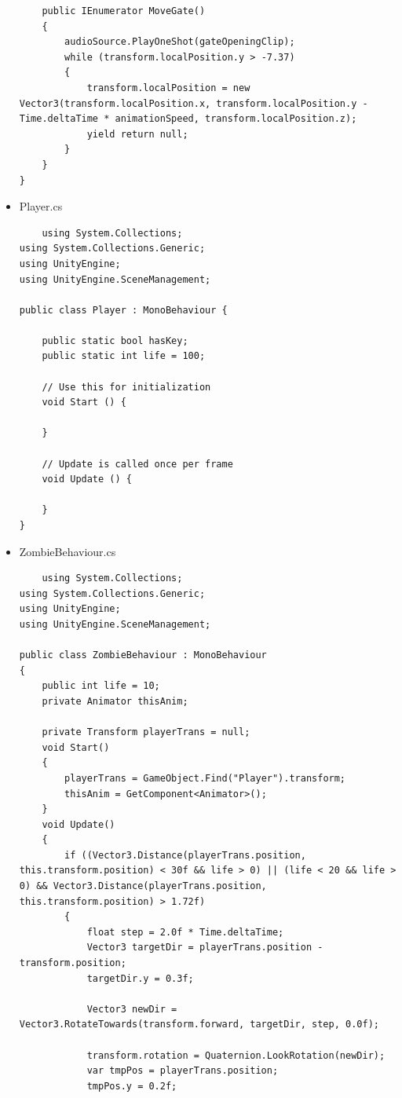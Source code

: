 \documentclass[12pt,a4paper]{article}
\begin{document}
\begin{itemize}
\begin{verbatim}
    public IEnumerator MoveGate()
    {
        audioSource.PlayOneShot(gateOpeningClip);
        while (transform.localPosition.y > -7.37)
        {
            transform.localPosition = new Vector3(transform.localPosition.x, transform.localPosition.y - Time.deltaTime * animationSpeed, transform.localPosition.z);
            yield return null;
        }
    }
}

	\end{verbatim}
	\item Player.cs
	\begin{verbatim}
	using System.Collections;
using System.Collections.Generic;
using UnityEngine;
using UnityEngine.SceneManagement;

public class Player : MonoBehaviour {

    public static bool hasKey;
    public static int life = 100;

	// Use this for initialization
	void Start () {
		
	}
	
	// Update is called once per frame
	void Update () {
        
    }
}

	\end{verbatim}
	\item ZombieBehaviour.cs
	\begin{verbatim}
	using System.Collections;
using System.Collections.Generic;
using UnityEngine;
using UnityEngine.SceneManagement;

public class ZombieBehaviour : MonoBehaviour
{
    public int life = 10;
    private Animator thisAnim;

    private Transform playerTrans = null;
    void Start()
    {
        playerTrans = GameObject.Find("Player").transform;
        thisAnim = GetComponent<Animator>();
    }
    void Update()
    {
        if ((Vector3.Distance(playerTrans.position, this.transform.position) < 30f && life > 0) || (life < 20 && life > 0) && Vector3.Distance(playerTrans.position, this.transform.position) > 1.72f)
        {
            float step = 2.0f * Time.deltaTime;
            Vector3 targetDir = playerTrans.position - transform.position;
            targetDir.y = 0.3f;

            Vector3 newDir = Vector3.RotateTowards(transform.forward, targetDir, step, 0.0f);

            transform.rotation = Quaternion.LookRotation(newDir);
            var tmpPos = playerTrans.position;
            tmpPos.y = 0.2f;


\end{verbatim}
\end{itemize}
\end{document}
